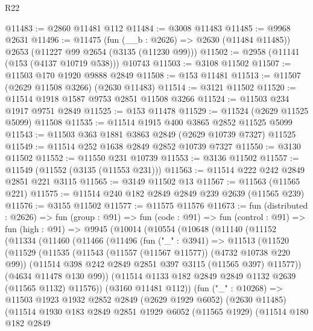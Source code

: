 \begin{lexlean}{R22}
\begin{coremodule}
@11483 := @2860 @11481 @112
@11484 := @3008 @11483
@11485 := @9968 @2631
@11496 := @11475
    (fun (__b : @2626) => @2630 (@11484 @11485))
    @2653
    (@11227 @99 @2654 (@3135 (@11230 @99)))
@11502 := @2958 (@11141 (@153 (@4137 @10719 @538))) @10743
@11503 := @3108 @11502
@11507 := @11503 @170 @1920 @9888 @2849
@11508 := @153 @11481
@11513 := @11507 (@2629 @11508 @3266) (@2630 @11483)
@11514 := @3121 @11502
@11520 := @11514 @1918 @1587 @9753 @2851 @11508 @3266
@11524 := @11503 @234 @1917 @9751 @2849
@11525 := @153 @11478
@11529 := @11524 (@2629 @11525 @5099) @11508
@11535 := @11514 @1915 @400 @3865 @2852 @11525 @5099
@11543 := @11503 @363 @1881 @3863 @2849 (@2629 @10739 @7327) @11525
@11549 := @11514 @252 @1638 @2849 @2852 @10739 @7327
@11550 := @3130 @11502
@11552 := @11550 @231 @10739
@11553 := @3136 @11502
@11557 := @11549 (@11552 (@3135 (@11553 @231)))
@11563 := @11514 @222 @242 @2849 @2851 @221 @3115
@11565 := @3149 @11502 @13
@11567 := @11563 (@11565 @221)
@11575 := @11514 @240 @182 @2849 @2849 @239 @2639 (@11565 @239)
@11576 := @3155 @11502
@11577 := @11575 @11576
@11673 := fun (distributed : @2626) =>
  fun (group : @91) =>
  fun (code : @91) =>
  fun (control : @91) =>
  fun (high : @91) =>
  @9945
    (@10014
      (@10554
        (@10648
          (@11140
            (@11152
              (@11334
                (@11460
                  (@11466
                    (@11496
                      (fun ("_" : @3941) =>
                      @11513
                        (@11520
                          (@11529
                            (@11535
                              (@11543 (@11557 (@11567 @11577)) (@4732 @10738 @220 @99))
                              (@11514 @398 @242 @2849 @2851 @397 @3115 (@11565 @397) @11577))
                            (@4634 @11478 @130 @99))
                          (@11514 @1133 @182 @2849 @2849 @1132 @2639 (@11565 @1132) @11576))
                        (@3160 @11481 @112))
                      (fun ("_" : @10268) =>
                      @11503
                        @1923
                        @1932
                        @2852
                        @2849
                        (@2629 @1929 @6052)
                        (@2630 @11485)
                        (@11514
                          @1930
                          @183
                          @2849
                          @2851
                          @1929
                          @6052
                          (@11565 @1929)
                          (@11514
                            @180
                            @182
                            @2849

\end{coremodule}
\end{lexlean}

